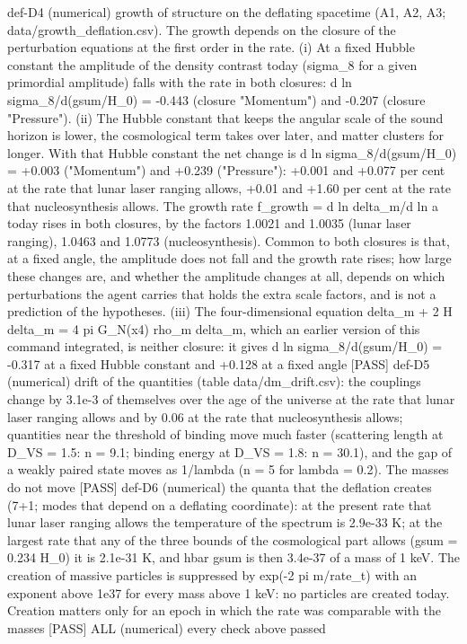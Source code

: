 \documentclass[
  10pt,
]{article}
\newenvironment{Shaded}{}{}
\newcommand{\NormalTok}[1]{#1}
\begin{document}
\begin{Shaded}
\begin{Highlighting}[]
\NormalTok{[PASS] def{-}D4  (numerical) growth of structure on the deflating spacetime (A1, A2, A3; data/growth\_deflation.csv). The growth depends on the closure of the perturbation equations at the first order in the rate. (i) At a fixed Hubble constant the amplitude of the density contrast today (sigma\_8 for a given primordial amplitude) falls with the rate in both closures: d ln sigma\_8/d(gsum/H\_0) = {-}0.443 (closure "Momentum") and {-}0.207 (closure "Pressure"). (ii) The Hubble constant that keeps the angular scale of the sound horizon is lower, the cosmological term takes over later, and matter clusters for longer. With that Hubble constant the net change is d ln sigma\_8/d(gsum/H\_0) = +0.003 ("Momentum") and +0.239 ("Pressure"): +0.001 and +0.077 per cent at the rate that lunar laser ranging allows, +0.01 and +1.60 per cent at the rate that nucleosynthesis allows. The growth rate f\_growth = d ln delta\_m/d ln a today rises in both closures, by the factors 1.0021 and 1.0035 (lunar laser ranging), 1.0463 and 1.0773 (nucleosynthesis). Common to both closures is that, at a fixed angle, the amplitude does not fall and the growth rate rises; how large these changes are, and whether the amplitude changes at all, depends on which perturbations the agent carries that holds the extra scale factors, and is not a prediction of the hypotheses. (iii) The four{-}dimensional equation delta\_m\textquotesingle{}\textquotesingle{} + 2 H delta\_m\textquotesingle{} = 4 pi G\_N(x4) rho\_m delta\_m, which an earlier version of this command integrated, is neither closure: it gives d ln sigma\_8/d(gsum/H\_0) = {-}0.317 at a fixed Hubble constant and +0.128 at a fixed angle}
\NormalTok{[PASS] def{-}D5  (numerical) drift of the quantities (table data/dm\_drift.csv): the couplings change by 3.1e{-}3 of themselves over the age of the universe at the rate that lunar laser ranging allows and by 0.06 at the rate that nucleosynthesis allows; quantities near the threshold of binding move much faster (scattering length at D\_VS = 1.5: n = 9.1; binding energy at D\_VS = 1.8: n = 30.1), and the gap of a weakly paired state moves as 1/lambda (n = 5 for lambda = 0.2). The masses do not move}
\NormalTok{[PASS] def{-}D6  (numerical) the quanta that the deflation creates (7+1; modes that depend on a deflating coordinate): at the present rate that lunar laser ranging allows the temperature of the spectrum is 2.9e{-}33 K; at the largest rate that any of the three bounds of the cosmological part allows (gsum = 0.234 H\_0) it is 2.1e{-}31 K, and hbar gsum is then 3.4e{-}37 of a mass of 1 keV. The creation of massive particles is suppressed by exp({-}2 pi m/rate\_t) with an exponent above 1e37 for every mass above 1 keV: no particles are created today. Creation matters only for an epoch in which the rate was comparable with the masses}
\NormalTok{[PASS] ALL  (numerical) every check above passed}
\end{Highlighting}
\end{Shaded}
\end{document}
